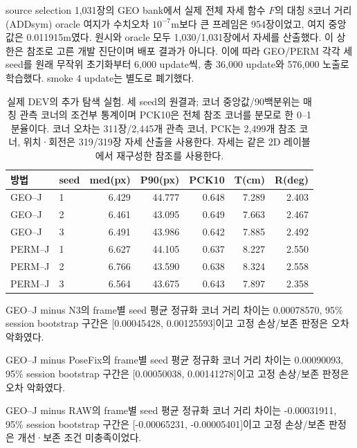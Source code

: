 source selection 1,031장의 GEO bank에서 실제 전체 자세 함수 $F$의 대칭 8코너 거리(ADDsym) oracle 여지가 수치오차 $10^{-7}$m보다 큰 프레임은 954장이었고, 여지 중앙값은 0.011915m였다. 원시와 oracle 모두 1,030/1,031장에서 자세를 산출했다. 이 상한은 참조로 고른 개발 진단이며 배포 결과가 아니다. 이에 따라 GEO/PERM 각각 세 seed를 원래 무작위 초기화부터 6,000 update씩, 총 36,000 update와 576,000 노출로 학습했다. smoke 4 update는 별도로 폐기했다.

\begin{table}[t]\centering\small\caption{실제 DEV의 추가 탐색 실험. 세 seed의 원결과; 코너 중앙값/90백분위는 매칭 관측 코너의 조건부 통계이며 PCK10은 전체 참조 코너를 분모로 한 0--1 분율이다. 코너 오차는 311장/2,445개 관측 코너, PCK는 2,499개 참조 코너, 위치·회전은 319/319장 자세 산출을 사용한다. 자세는 같은 2D 레이블에서 재구성한 참조를 사용한다.}\label{sup:joint_action_results}\begin{tabular}{llrrrrr}\toprule 방법&seed&med(px)&P90(px)&PCK10&T(cm)&R(deg)\\\midrule

GEO--J & 1 & 6.429 & 44.777 & 0.648 & 7.289 & 2.403\\

GEO--J & 2 & 6.461 & 43.095 & 0.649 & 7.663 & 2.467\\

GEO--J & 3 & 6.491 & 43.986 & 0.642 & 7.885 & 2.492\\

PERM--J & 1 & 6.627 & 44.105 & 0.637 & 8.227 & 2.550\\

PERM--J & 2 & 6.766 & 43.590 & 0.638 & 8.324 & 2.558\\

PERM--J & 3 & 6.564 & 43.675 & 0.643 & 7.897 & 2.358\\

\bottomrule\end{tabular}\end{table}

GEO--J minus N3의 frame별 seed 평균 정규화 코너 거리 차이는 0.00078570, 95\% session bootstrap 구간은 [0.00045428, 0.00125593]이고 고정 손상/보존 판정은 오차 악화였다.

GEO--J minus PoseFix의 frame별 seed 평균 정규화 코너 거리 차이는 0.00090093, 95\% session bootstrap 구간은 [0.00050038, 0.00141278]이고 고정 손상/보존 판정은 오차 악화였다.

GEO--J minus RAW의 frame별 seed 평균 정규화 코너 거리 차이는 -0.00031911, 95\% session bootstrap 구간은 [-0.00065231, -0.00005401]이고 고정 손상/보존 판정은 개선·보존 조건 미충족이었다.

